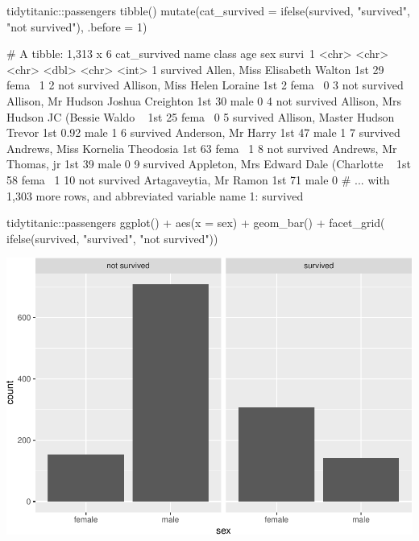 \begin{Schunk}
\begin{Sinput}
tidytitanic::passengers %
  tibble() %
  mutate(cat_survived = ifelse(survived, "survived", "not survived"), 
         .before = 1)
\end{Sinput}
\begin{Soutput}
     # A tibble: 1,313 x 6
        cat_survived name                                   class   age sex   survi~1
        <chr>        <chr>                                  <chr> <dbl> <chr>   <int>
      1 survived     Allen, Miss Elisabeth Walton           1st   29    fema~       1
      2 not survived Allison, Miss Helen Loraine            1st    2    fema~       0
      3 not survived Allison, Mr Hudson Joshua Creighton    1st   30    male        0
      4 not survived Allison, Mrs Hudson JC (Bessie Waldo ~ 1st   25    fema~       0
      5 survived     Allison, Master Hudson Trevor          1st    0.92 male        1
      6 survived     Anderson, Mr Harry                     1st   47    male        1
      7 survived     Andrews, Miss Kornelia Theodosia       1st   63    fema~       1
      8 not survived Andrews, Mr Thomas, jr                 1st   39    male        0
      9 survived     Appleton, Mrs Edward Dale (Charlotte ~ 1st   58    fema~       1
     10 not survived Artagaveytia, Mr Ramon                 1st   71    male        0
     # ... with 1,303 more rows, and abbreviated variable name 1: survived
\end{Soutput}
\begin{Sinput}
tidytitanic::passengers %
ggplot() + 
  aes(x = sex) + 
  geom_bar() + 
  facet_grid(~ ifelse(survived, "survived", "not survived"))
\end{Sinput}

\includegraphics[width=0.69\linewidth]{r_journal_files/figure-latex/unnamed-chunk-8-1} \end{Schunk}

